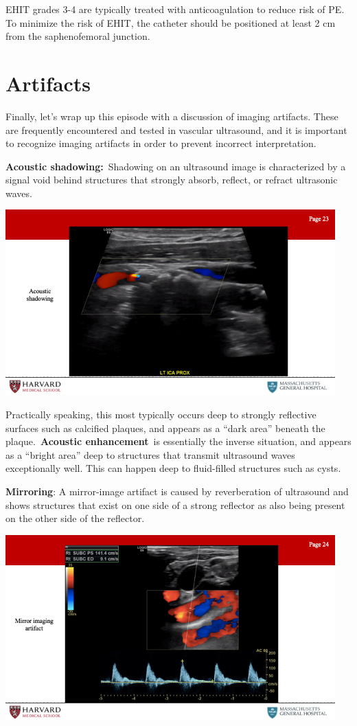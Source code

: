 \documentclass[
]{book}
\begin{document}
EHIT grades 3-4 are typically treated with anticoagulation to reduce
risk of PE. To minimize the risk of EHIT, the catheter should be
positioned at least 2 cm from the saphenofemoral junction.

\hypertarget{artifacts}{%
\section{Artifacts}\label{artifacts}}

Finally, let's wrap up this episode with a discussion of imaging
artifacts. These are frequently encountered and tested in vascular
ultrasound, and it is important to recognize imaging artifacts in order
to prevent incorrect interpretation.

\textbf{Acoustic shadowing:}~Shadowing on an ultrasound image is
characterized by a signal void behind structures that strongly absorb,
reflect, or refract ultrasonic waves.

\includegraphics[width=5in]{images/vasc_lab/Slide24}

Practically speaking, this most typically occurs deep to strongly
reflective surfaces such as calcified plaques, and appears as a ``dark
area'' beneath the plaque.~\textbf{Acoustic enhancement}~is essentially the
inverse situation, and appears as a ``bright area'' deep to structures
that transmit ultrasound waves exceptionally well. This can happen deep
to fluid-filled structures such as cysts.

\textbf{Mirroring}: A mirror-image artifact is caused by reverberation of
ultrasound and shows structures that exist on one side of a strong
reflector as also being present on the other side of the reflector.

\includegraphics[width=5in]{images/vasc_lab/Slide25}
\end{document}
